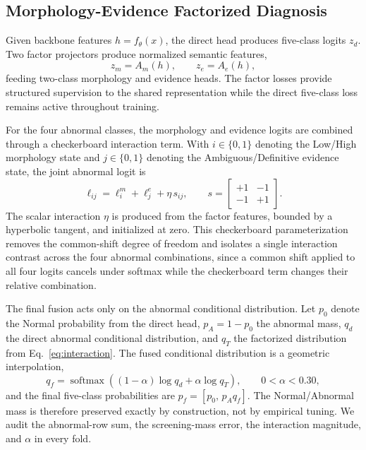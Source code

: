 \documentclass[conference]{IEEEtran}
\begin{document}
\subsection{Morphology-Evidence Factorized Diagnosis}
\label{sec:factorized}
Given backbone features $h=f_{\theta}(x)$, the direct head produces
five-class logits $z_d$. Two factor projectors produce normalized
semantic features,
\begin{equation}
    z_m=A_m(h), \qquad z_e=A_e(h),
    \label{eq:factorproject}
\end{equation}
feeding two-class morphology and evidence heads. The factor losses
provide structured supervision to the shared representation while the
direct five-class loss remains active throughout training.

For the four abnormal classes, the morphology and evidence logits are
combined through a checkerboard interaction term. With $i\in\{0,1\}$
denoting the Low/High morphology state and $j\in\{0,1\}$ denoting the
Ambiguous/Definitive evidence state, the joint abnormal logit is
\begin{equation}
    \ell_{ij}=\ell^m_i+\ell^e_j+\eta\,s_{ij}, \qquad
    s=\begin{bmatrix}+1&-1\\-1&+1\end{bmatrix}.
    \label{eq:interaction}
\end{equation}
The scalar interaction $\eta$ is produced from the factor features,
bounded by a hyperbolic tangent, and initialized at zero. This
checkerboard parameterization removes the common-shift degree of
freedom and isolates a single interaction contrast across the four
abnormal combinations, since a common shift applied to all four logits
cancels under softmax while the checkerboard term changes their
relative combination.

The final fusion acts only on the abnormal conditional distribution.
Let $p_0$ denote the Normal probability from the direct head,
$p_A=1-p_0$ the abnormal mass, $q_d$ the direct abnormal conditional
distribution, and $q_T$ the factorized distribution from
Eq.~\eqref{eq:interaction}. The fused conditional distribution is a
geometric interpolation,
\begin{equation}
    q_f=\operatorname{softmax}\left((1-\alpha)\log q_d+\alpha\log q_T\right),
    \qquad 0<\alpha<0.30,
    \label{eq:fusion}
\end{equation}
and the final five-class probabilities are $p_f=[p_0,\, p_Aq_f]$. The
Normal/Abnormal mass is therefore preserved exactly by construction,
not by empirical tuning. We audit the abnormal-row sum, the
screening-mass error, the interaction magnitude, and $\alpha$ in every
fold.
\end{document}
